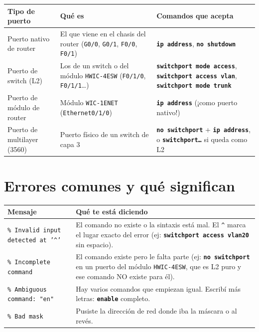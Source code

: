 \documentclass[11pt,a4paper]{report}
\newcommand{\cmd}[1]{\texttt{\textbf{#1}}}
\begin{document}
\begin{longtable}{@{}p{4.5cm}p{6.5cm}p{4.5cm}@{}}
\toprule
\textbf{Tipo de puerto} & \textbf{Qué es} & \textbf{Comandos que acepta} \\
\midrule
\endhead
Puerto nativo de router & El que viene en el chasis del router (\texttt{G0/0}, \texttt{G0/1}, \texttt{F0/0}, \texttt{F0/1}) & \cmd{ip address}, \cmd{no shutdown} \\
\addlinespace
Puerto de switch (L2) & Los de un switch o del módulo \texttt{HWIC-4ESW} (\texttt{F0/1/0}, \texttt{F0/1/1}\dots) & \cmd{switchport mode access}, \cmd{switchport access vlan}, \cmd{switchport mode trunk} \\
\addlinespace
Puerto de módulo de router & Módulo \texttt{WIC-1ENET} (\texttt{Ethernet0/1/0}) & \cmd{ip address} (¡como puerto nativo!) \\
\addlinespace
Puerto de multilayer (3560) & Puerto físico de un switch de capa 3 & \cmd{no switchport} + \cmd{ip address}, o \cmd{switchport\dots} si queda como L2 \\
\bottomrule
\end{longtable}

\section{Errores comunes y qué significan}

\begin{longtable}{@{}p{5.5cm}p{10cm}@{}}
\toprule
\textbf{Mensaje} & \textbf{Qué te está diciendo} \\
\midrule
\endhead
\texttt{\% Invalid input detected at '\^{}'} & El comando no existe o la sintaxis está mal. El \texttt{\^{}} marca el lugar exacto del error (ej: \cmd{switchport access vlan20} sin espacio). \\
\addlinespace
\texttt{\% Incomplete command} & El comando existe pero le falta parte (ej: \cmd{no switchport} en un puerto del módulo \texttt{HWIC-4ESW}, que es L2 puro y ese comando NO existe para él). \\
\addlinespace
\texttt{\% Ambiguous command: "en"} & Hay varios comandos que empiezan igual. Escribí más letras: \cmd{enable} completo. \\
\addlinespace
\texttt{\% Bad mask} & Pusiste la dirección de red donde iba la máscara o al revés. \\
\bottomrule
\end{longtable}

\end{document}
